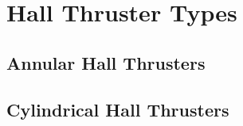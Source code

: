 \section{Hall Thruster Types}

\subsection{Annular Hall Thrusters}

\subsection{Cylindrical Hall Thrusters}